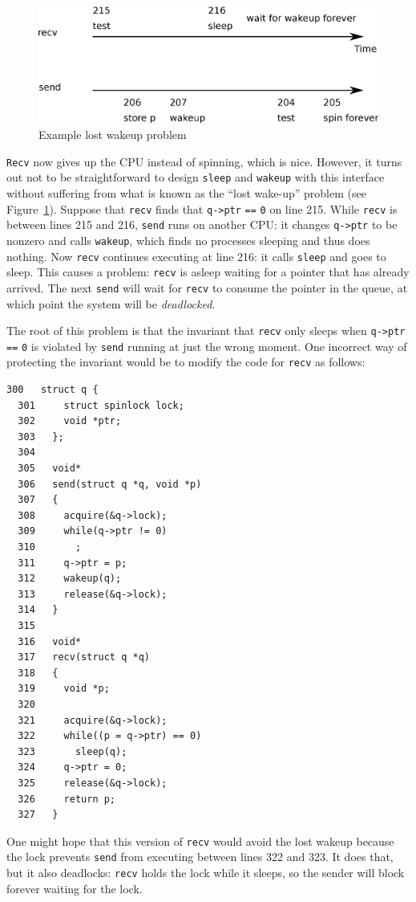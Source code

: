 \begin{figure}[t]
\center
\includegraphics[scale=0.5]{fig/deadlock.eps}
\caption{Example lost wakeup problem}
\label{fig:deadlock}
\end{figure}

\lstinline{Recv}
now gives up the CPU instead of spinning, which is nice.
However, it turns out not to be straightforward to design
\lstinline{sleep}
and 
\lstinline{wakeup}
with this interface without suffering
from what is known as the ``lost wake-up'' problem (see 
Figure~\ref{fig:deadlock}).
Suppose that
\lstinline{recv}
finds that
\lstinline{q->ptr}
\lstinline{==}
\lstinline{0} 
on line 215.
While
\lstinline{recv}
is between lines 215 and 216,
\lstinline{send}
runs on another CPU:
it changes
\lstinline{q->ptr}
to be nonzero and calls
\lstinline{wakeup},
which finds no processes sleeping and thus does nothing.
Now
\lstinline{recv}
continues executing at line 216:
it calls
\lstinline{sleep}
and goes to sleep.
This causes a problem:
\lstinline{recv}
is asleep waiting for a pointer
that has already arrived.
The next
\lstinline{send}
will wait for 
\lstinline{recv}
to consume the pointer in the queue,
at which point the system will be 
\textit{deadlocked}.

The root of this problem is that the
invariant that
\lstinline{recv}
only sleeps when
\lstinline{q->ptr}
\lstinline{==}
\lstinline{0}
is violated by 
\lstinline{send}
running at just the wrong moment.
One incorrect way of protecting the invariant would be to modify the code for
\lstinline{recv}
as follows:
\begin{lstlisting}[]
  300	struct q {
  301	  struct spinlock lock;
  302	  void *ptr;
  303	};
  304	
  305	void*
  306	send(struct q *q, void *p)
  307	{
  308	  acquire(&q->lock);
  309	  while(q->ptr != 0)
  310	    ;
  311	  q->ptr = p;
  312	  wakeup(q);
  313	  release(&q->lock);
  314	}
  315	
  316	void*
  317	recv(struct q *q)
  318	{
  319	  void *p;
  320	
  321	  acquire(&q->lock);
  322	  while((p = q->ptr) == 0)
  323	    sleep(q);
  324	  q->ptr = 0;
  325	  release(&q->lock);
  326	  return p;
  327	}
\end{lstlisting}
One might hope that this version of
\lstinline{recv}
would avoid the lost wakeup because the lock prevents
\lstinline{send}
from executing between lines 322 and 323.
It does that, but it also deadlocks:
\lstinline{recv}
holds the lock while it sleeps,
so the sender will block forever waiting for the lock.

